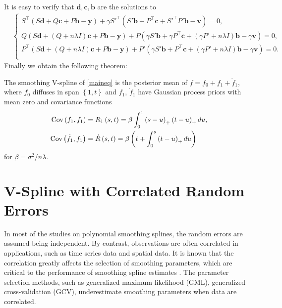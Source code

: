 It is easy to verify that $\mathbf{d},\mathbf{c},\mathbf{b}$ are the solutions to
\begin{align*}
&\begin{cases}
S^\top \left(S\mathbf{d} +Q\mathbf{c}+P\mathbf{b}-\mathbf{y}\right) +\gamma S'^\top\left( S'\mathbf{b}+ P^\top \mathbf{c}+S'^\top P'\mathbf{b}-\mathbf{v}\right)=0, \\
Q\left(S\mathbf{d}+\left(Q+n\lambda I\right)\mathbf{c}+P\mathbf{b}-\mathbf{y}\right) + P \left( \gamma S' \mathbf{b} + \gamma P^\top \mathbf{c}+ \left(\gamma P'+n\lambda I\right) \mathbf{b}- \gamma \mathbf{v}\right)=0, \\
P^\top \left(S\mathbf{d}+\left(Q+n\lambda I\right) \mathbf{c} +P\mathbf{b}-\mathbf{y}\right)+P'\left(\gamma S'\mathbf{b}+P^\top \mathbf{c}+\left(\gamma P'+n\lambda I\right)\mathbf{b}- \gamma\mathbf{v}\right)=0. \\
\end{cases}
\end{align*}
Finally we obtain the following theorem: 
\begin{theorem}
The smoothing V-spline of \eqref{maineq} is the posterior
mean of $f=f_0+f_1 + \dot{f}_1$, where $f_0$ diffuses in span $\left\lbrace 1,t\right\rbrace$ and $f_1$, $\dot{f}_1$ have Gaussian process priors with mean zero and covariance functions
\begin{align*}
\mathrm{Cov} \left(f_1,f_1\right)   &= R_1\left(s,t\right)   =\beta \int_{0}^{1} \left(s-u\right)_+\left(t-u\right)_+du, \\
\mathrm{Cov} \left(\dot{f}_1,f_1\right)  &= \dot{R}\left(s,t\right) =\beta \left(t+\int_0^s\left(t-u\right)_+du \right)
\end{align*}
for $\beta = \sigma^2/n\lambda$.
\end{theorem}



\section{V-Spline with Correlated Random Errors}


In most of the studies on polynomial smoothing splines, the random errors are assumed being independent. By contrast,  observations are often correlated in applications, such as time series data and spatial data. It is known that the correlation greatly affects the selection of smoothing parameters, which are critical to the performance of smoothing spline estimates \citep{wang1998smoothing}.  The parameter selection methods, such as generalized maximum likelihood (GML), generalized cross-validation (GCV), underestimate smoothing parameters when data are correlated. 


